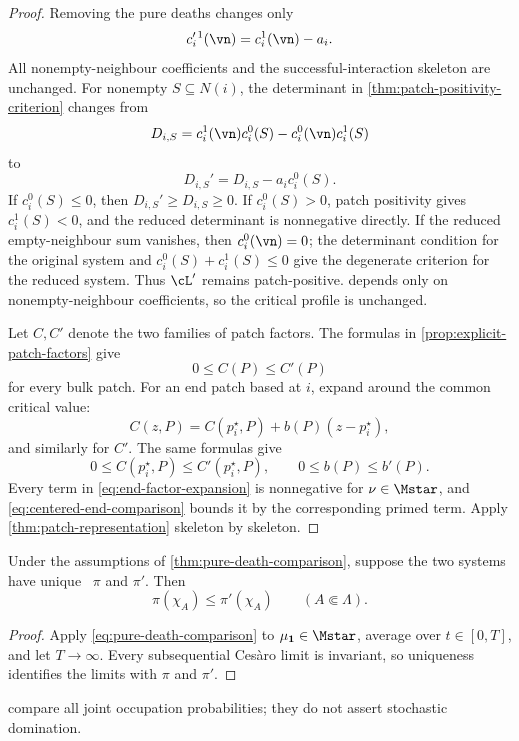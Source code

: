 \begin{proof}
Removing the pure deaths changes only
\[
  c_i^{\prime\,1}(\vn)=c_i^1(\vn)-a_i.
\]
All nonempty-neighbour coefficients and the successful-interaction
skeleton are unchanged. For nonempty \(S\subseteq N(i)\), the
determinant in \cref{thm:patch-positivity-criterion} changes from
\[
  D_{i,S}
  =
  c_i^1(\vn)c_i^0(S)-c_i^0(\vn)c_i^1(S)
\]
to
\[
  D_{i,S}'=D_{i,S}-a_ic_i^0(S).
\]
If \(c_i^0(S)\le0\), then \(D_{i,S}'\ge D_{i,S}\ge0\). If
\(c_i^0(S)>0\), patch positivity gives \(c_i^1(S)<0\), and the reduced
determinant is nonnegative directly. If the reduced empty-neighbour
sum vanishes, then \(c_i^0(\vn)=0\); the determinant condition for the
original system and
\(c_i^0(S)+c_i^1(S)\le0\) give the degenerate criterion for the
reduced system. Thus \(\cL'\) remains patch-positive.
 depends only on nonempty-neighbour
coefficients, so the critical profile is unchanged.

Let \(C,C'\) denote the two families of patch factors. The formulas in
\cref{prop:explicit-patch-factors} give
\[
  0\le C(P)\le C'(P)
\]
for every bulk patch. For an end patch based at \(i\), expand around
the common critical value:
\[
  C(z,P)=C(p_i^\star,P)+b(P)(z-p_i^\star),
\]
and similarly for \(C'\). The same formulas give
\begin{equation}
  0\le C(p_i^\star,P)\le C'(p_i^\star,P),
  \qquad
  0\le b(P)\le b'(P).
  \label{eq:centered-end-comparison}
\end{equation}
Every term in \eqref{eq:end-factor-expansion} is nonnegative for
\(\nu\in\Mstar\), and \eqref{eq:centered-end-comparison} bounds it by
the corresponding primed term. Apply
\cref{thm:patch-representation} skeleton by skeleton.
\end{proof}

\begin{corollary}
\label{cor:invariant-comparison}
Under the assumptions of \cref{thm:pure-death-comparison}, suppose the
two systems have unique \invariantmeasures\ \(\pi\) and \(\pi'\).
Then
\[
  \pi(\chi_A)\le\pi'(\chi_A)
  \qquad(A\Subset\Lambda).
\]
\end{corollary}

\begin{proof}
Apply \eqref{eq:pure-death-comparison} to
\(\mu_{\mathbf1}\in\Mstar\), average over \(t\in[0,T]\), and let
\(T\to\infty\). Every subsequential Cesàro limit is invariant, so
uniqueness identifies the limits with \(\pi\) and \(\pi'\).
\end{proof}

\begin{remark}
\label{rem:moment-not-stochastic}
 compare all
joint occupation probabilities; they do not assert stochastic
domination.
\end{remark}
